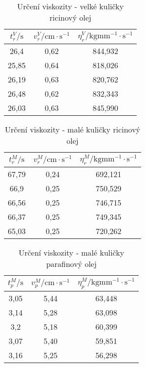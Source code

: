 \documentclass[a4paper,12pt]{article}
\begin{document}
  \begin{table}[!htb]
	\label{viskozitar-velke kulicky}
     \caption[]{Určení viskozity - velké kuličky ricinový olej} 
   \begin{center}
    \begin{tabular}{|c|c|c|}
        \hline
        $t_{r}^V/\mathrm{s}$	& $v_{r}^V/\mathrm{cm\cdot s^{-1}}$	&	$\eta_{r}^{V}/\mathrm{kgmm^{-1}\cdot s^{-1}}$ \\
\hline		\hline		
26,4	&	0,62	&	844,932\\
\hline				
25,85	&	0,64	&	818,026\\
\hline				
26,19	&	0,63	&	820,762\\
\hline				
26,48	&	0,62	&	832,343\\
\hline				
26,03	&	0,63	&	845,990\\
\hline				
    \end{tabular}
     \end{center}
  \end{table}
  
    \begin{table}[!htb]
	\label{viskozitar-male kulicky}
     \caption[]{Určení viskozity - malé kuličky ricinový olej} 
   \begin{center}
    \begin{tabular}{|c|c|c|}
        \hline
        $t_{r}^M/\mathrm{s}$	& $v_{r}^M/\mathrm{cm\cdot s^{-1}}$	&	$\eta_{r}^{M}/\mathrm{kgmm^{-1}\cdot s^{-1}}$ \\
\hline		\hline	
  67,79	&	0,24	&	692,121\\
\hline				
66,9	&	0,25	&	750,529\\
\hline				
66,56	&	0,25	&	746,715\\
\hline				
66,37	&	0,25	&	749,345\\
\hline				
65,03	&	0,25	&	720,262\\
\hline
      \end{tabular}
     \end{center}
  \end{table}
  
    \begin{table}[!htb]
	\label{viskozitap-male kulicky}
     \caption[]{Určení viskozity - malé kuličky parafinový olej} 
   \begin{center}
    \begin{tabular}{|c|c|c|}
        \hline
        $t_{p}^M/\mathrm{s}$	& $v_{p}^M/\mathrm{cm\cdot s^{-1}}$	&	$\eta_{p}^{M}/\mathrm{kgmm^{-1}\cdot s^{-1}}$ \\
        \hline \hline
3,05	&	5,44	&	63,448\\
\hline				
3,14	&	5,28	&	63,098\\
\hline				
3,2	&	5,18	&	60,399\\
\hline				
3,07	&	5,40	&	59,851\\
\hline				
3,16	&	5,25	&	56,298\\
\hline				
      \end{tabular}
     \end{center}
  \end{table}  
 
\end{document}
